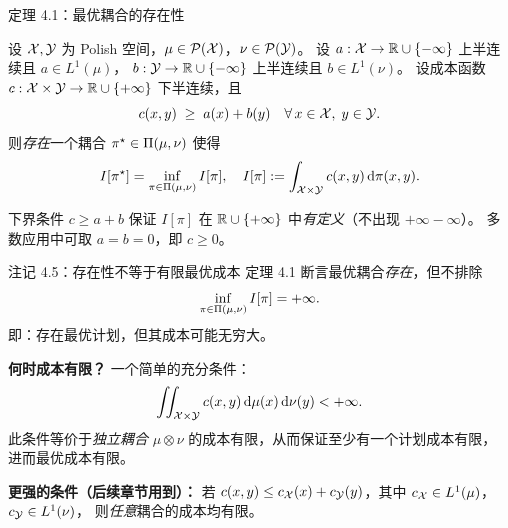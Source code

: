 \begin{frame}{定理 4.1：最优耦合的存在性}

  设 $\mathcal{X},\mathcal{Y}$ 为 Polish 空间，$\mu\in\mathcal{P}(\mathcal{X})$，$\nu\in\mathcal{P}(\mathcal{Y})$。
  设 $a:\mathcal{X}\to\mathbb{R}\cup\{-\infty\}$ 上半连续且 $a\in L^1(\mu)$，
  $b:\mathcal{Y}\to\mathbb{R}\cup\{-\infty\}$ 上半连续且 $b\in L^1(\nu)$。
  设成本函数 $c:\mathcal{X}\times\mathcal{Y}\to\mathbb{R}\cup\{+\infty\}$ 下半连续，且
  \[
    c(x,y) \;\ge\; a(x)+b(y) \quad \forall\, x\in\mathcal{X},\; y\in\mathcal{Y}.
  \]
  则\emph{存在}一个耦合 $\pi^\star\in\Pi(\mu,\nu)$ 使得
  \[
    I[\pi^\star] = \inf_{\pi\in\Pi(\mu,\nu)} I[\pi], \quad I[\pi]:=\int_{\mathcal{X}\times\mathcal{Y}} c(x,y)\,\mathrm{d}\pi(x,y).
  \]

   下界条件 $c\ge a+b$ 保证 $I[\pi]$ 在 $\mathbb{R}\cup\{+\infty\}$ 中\emph{有定义}（不出现 $+\infty-\infty$）。
  多数应用中可取 $a=b=0$，即 $c\ge0$。

\end{frame}

\begin{frame}{注记 4.5：存在性不等于有限最优成本}
   定理 4.1 断言最优耦合\emph{存在}，但不排除
  \[
    \inf_{\pi\in\Pi(\mu,\nu)} I[\pi] = +\infty.
  \]
  即：存在最优计划，但其成本可能无穷大。

  \textbf{何时成本有限？} 一个简单的充分条件：
  \[
    \iint_{\mathcal{X}\times\mathcal{Y}} c(x,y)\,\mathrm{d}\mu(x)\,\mathrm{d}\nu(y) < +\infty.
  \]
  此条件等价于\emph{独立耦合} $\mu\otimes\nu$ 的成本有限，从而保证至少有一个计划成本有限，
  进而最优成本有限。

  \textbf{更强的条件（后续章节用到）：} 若
  $c(x,y)\le c_{\mathcal{X}}(x)+c_{\mathcal{Y}}(y)$，其中 $c_{\mathcal{X}}\in L^1(\mu)$，$c_{\mathcal{Y}}\in L^1(\nu)$，
  则\emph{任意}耦合的成本均有限。

\end{frame}

